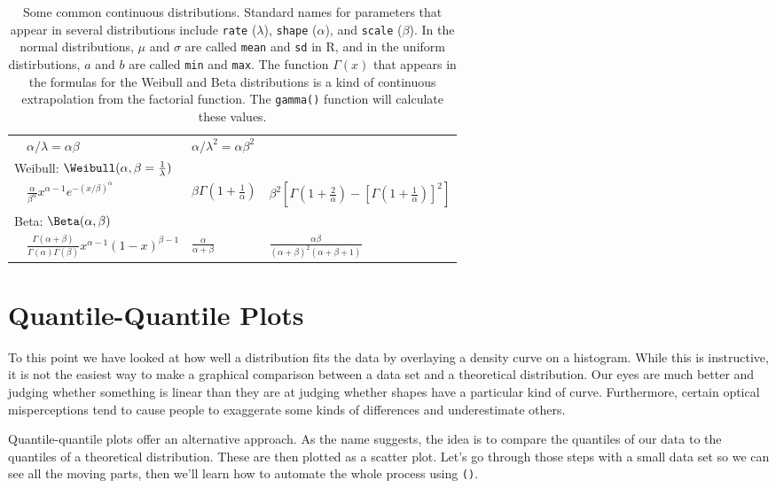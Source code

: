 \documentclass[twoside]{book}\usepackage[]{graphicx}\usepackage[]{xcolor}
\def\myindex#1{\index{#1}}
\newcommand{\Rindex}[1]{\index{\texttt{#1}}}
\newcommand{\function}[1]{{\color{purple!75!blue}\texttt{\StrSubstitute{#1}{()}{}()}}\Rindex{#1}}
\def\R{{\sf R}}
\begin{document}
\begin{table}
\begin{center}
\begin{tabular}{|p{5mm}p{40mm}p{25mm}p{45mm}|}
  	& $\alpha/\lambda = \alpha \beta$ 
	& $\alpha/\lambda^2 = \alpha \beta^2$
\\[4.2mm]
\multicolumn{2}{|l}{Weibull: $\Weibull(\alpha,\beta=\frac{1}{\lambda})$} && \\
&
	  $\displaystyle \frac{\alpha}{\beta^\alpha} x^{\alpha-1} e^{-(x/\beta)^\alpha}$
	& 
	  $\beta \Gamma(1 + \frac1{\alpha})$
	&
	  $\beta^2 \left[ \Gamma(1 + \frac{2}{\alpha}) 
	  - \left[ \Gamma(1 + \frac{1}{\alpha}) \right]^2 \right]
	  $ 
\\[4.0mm]
\multicolumn{2}{|l}{  Beta: $\Beta(\alpha, \beta)$ } && \\
	& 
  $\frac{\Gamma(\alpha+\beta)}{\Gamma(\alpha)\Gamma(\beta)} 
		x^{\alpha-1}(1-x)^{\beta-1}$
  	& 
	  $\displaystyle \frac{\alpha}{\alpha + \beta}$
	  &
	  $\displaystyle \frac{\alpha \beta }{(\alpha + \beta)^2(\alpha + \beta + 1)}$
\\[4mm]
\hline
\end{tabular}
\end{center}
\caption{Some common continuous distributions.
Standard names for parameters that appear in several distributions
include \texttt{rate} ($\lambda$), \texttt{shape} ($\alpha$), and \texttt{scale} ($\beta$).
In the normal distributions, $\mu$ and $\sigma$ are called \texttt{mean} and \texttt{sd}
in \R, and in the uniform distirbutions, $a$ and $b$ are called \texttt{min} and \texttt{max}.
The function $\Gamma(x)$ that appears in the formulas for the Weibull and Beta
distributions is a kind of continuous extrapolation from the factorial function.
The \texttt{gamma()} function will calculate these values.}
\label{table:contDist}
\end{table}


\section{Quantile-Quantile Plots}

\myindex{quantile-quantile plot}%
To this point we have looked at how well a distribution fits the data by overlaying a density
curve on a histogram.  While this is instructive, it is not the easiest way to make a 
graphical comparison between a data set and a theoretical distribution.   Our eyes
are much better and judging whether something is linear than they are at judging whether 
shapes have a particular kind of curve.  Furthermore, certain optical misperceptions
tend to cause people to exaggerate some kinds of differences and underestimate others.

Quantile-quantile plots offer an alternative approach.  As the name suggests, the idea is 
to compare the quantiles of our data to the quantiles of a theoretical distribution.  These
are then plotted as a scatter plot.  Let's go through those steps with a small data
set so we can see all the moving parts, then we'll learn how to automate the whole
process using \function{qqmath()}.
\end{document}
